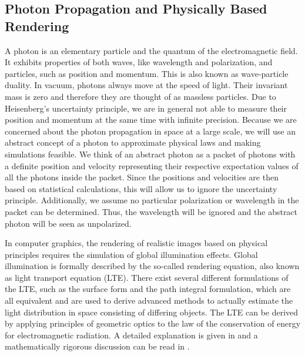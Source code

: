\documentclass{stdlocal}
\begin{document}


  \subsection{Photon Propagation and Physically Based Rendering} %
  \label{sub:photon_propagation_and_physically_based_rendering}
    A photon is an elementary particle and the quantum of the electromagnetic field.
    It exhibits properties of both waves, like wavelength and polarization, and particles, such as position and momentum.
    This is also known as wave-particle duality.
    In vacuum, photons always move at the speed of light.
    Their invariant mass is zero and therefore they are thought of as massless particles.
    Due to Heisenberg's uncertainty principle, we are in general not able to measure their position and momentum at the same time with infinite precision.
    Because we are concerned about the photon propagation in space at a large scale, we will use an abstract concept of a photon to approximate physical laws and making simulations feasible.
    We think of an abstract photon as a packet of photons with a definite position and velocity representing their respective expectation values of all the photons inside the packet.
    Since the positions and velocities are then based on statistical calculations, this will allow us to ignore the uncertainty principle.
    Additionally, we assume no particular polarization or wavelength in the packet can be determined.
    Thus, the wavelength will be ignored and the abstract photon will be seen as unpolarized.

    In computer graphics, the rendering of realistic images based on physical principles requires the simulation of global illumination effects.
    Global illumination is formally described by the so-called rendering equation, also known as light transport equation (LTE).
    There exist several different formulations of the LTE, such as the surface form and the path integral formulation, which are all equivalent and are used to derive advanced methods to actually estimate the light distribution in space consisting of differing objects.
    The LTE can be derived by applying principles of geometric optics to the law of the conservation of energy for electromagnetic radiation.
    A detailed explanation is given in \textcite{pharr2016} and a mathematically rigorous discussion can be read in \textcite{pawellek2017}.
\end{document}
